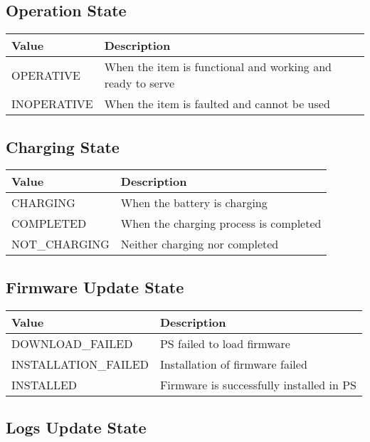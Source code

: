 \subsection{Operation State}
\label{types:OperationState}

\begin{tabularx}{\linewidth}{ | l | X | }
  \hline
  \rowcolor{table-head}
  Value & Description \\
  \hline
  OPERATIVE 		& When the item is functional and working and ready to serve \\
  INOPERATIVE 	& When the item is faulted and cannot be used \\
  \hline
\end{tabularx}

\subsection{Charging State}
\label{types:ChargingState}

\begin{tabularx}{\linewidth}{ | l | X | }
  \hline
  \rowcolor{table-head}
  Value & Description \\
  \hline
  CHARGING 		& When the battery is charging\\
  COMPLETED 		& When the charging process is completed \\
  NOT\_CHARGING 	& Neither charging nor completed\\
  \hline
\end{tabularx}

\subsection{Firmware Update State}
\label{types:FirmwareState}

\begin{tabularx}{\linewidth}{ | l | X | }
  \hline
  \rowcolor{table-head}
  Value & Description \\
  \hline
  DOWNLOAD\_FAILED & \acs{PS} failed to load firmware \\
  INSTALLATION\_FAILED & Installation of firmware failed \\
  INSTALLED & Firmware is successfully installed in \acs{PS} \\
  \hline
\end{tabularx}

\subsection{Logs Update State}
\label{types:LogUpdateState}

